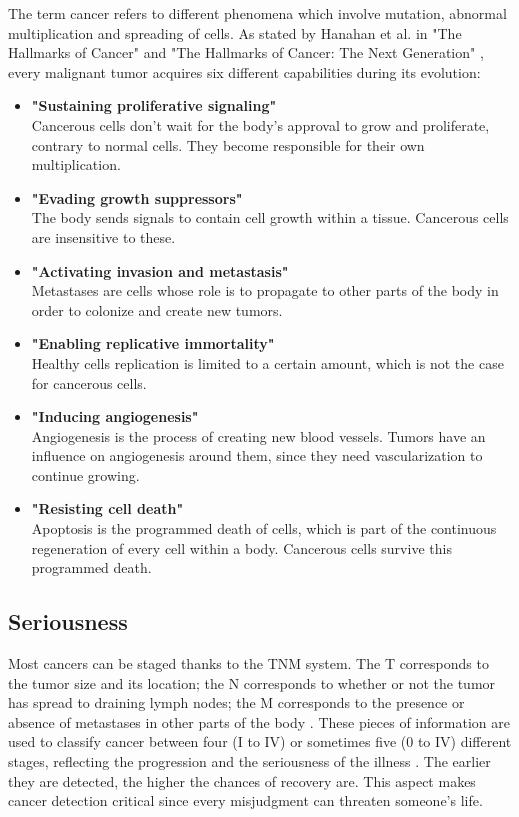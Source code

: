 The term cancer refers to different phenomena which involve mutation, abnormal multiplication and spreading of cells. As stated by Hanahan et al. in "The Hallmarks of Cancer" \cite{19} and "The Hallmarks of Cancer: The Next Generation" \cite{20}, every malignant tumor acquires six different capabilities during its evolution: 
\begin{itemize}
	\item \textbf{"Sustaining proliferative signaling"}\\ Cancerous cells don't wait for the body's approval to grow and proliferate, contrary to normal cells. They become responsible for their own multiplication.
	\item \textbf{"Evading growth suppressors"}\\
The body sends signals to contain cell growth within a tissue. Cancerous cells are insensitive to these. 
	\item \textbf{"Activating invasion and metastasis"}\\
Metastases are cells whose role is to propagate to other parts of the body in order to colonize and create new tumors. 
	\item \textbf{"Enabling replicative immortality"}\\
Healthy cells replication is limited to a certain amount, which is not the case for cancerous cells. 
	\item \textbf{"Inducing angiogenesis"}
\\Angiogenesis is the process of creating new blood vessels. Tumors have an influence on angiogenesis around them, since they need vascularization to continue growing. 
	\item \textbf{"Resisting cell death"}
\\Apoptosis is the programmed death of cells, which is part of the continuous regeneration of every cell within a body. Cancerous cells survive this programmed death. 
\end{itemize}


\subsection{Seriousness}
\setlength{\marginparwidth}{3cm}\leavevmode {}Most cancers can be staged thanks to the TNM system. The T corresponds to the tumor size and its location; the N corresponds to whether or not the tumor has spread to draining lymph nodes; the M corresponds to the presence or absence of metastases in other parts of the body \cite{21}. These pieces of information are used to classify cancer between four (I to IV) or sometimes five (0 to IV) different stages, reflecting the progression and the seriousness of the illness \cite{22}. The earlier they are detected, the higher the chances of recovery are. This aspect makes cancer detection critical since every misjudgment can threaten someone's life. 


